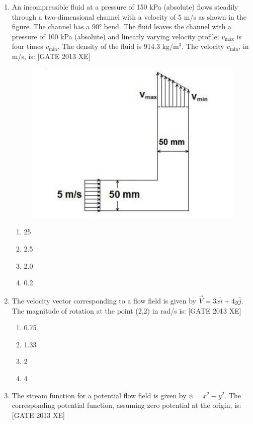 \documentclass[journal,12pt,onecolumn]{IEEEtran}
\theoremstyle{remark}
\begin{document}
\begin{enumerate}
\item An incompressible fluid at a pressure of 150 kPa (absolute) flows steadily through a two-dimensional channel with a velocity of 5 m/s as shown in the figure. The channel has a 90° bend. The fluid leaves the channel with a pressure of 100 kPa (absolute) and linearly varying velocity profile; $v_{\max}$ is four times $v_{\min}$. The density of the fluid is 914.3 kg/m$^3$. The velocity $v_{\min}$, in m/s, is: \hfill[GATE 2013 XE]

\begin{figure}[H]
    \centering
    \includegraphics[width=0.5\columnwidth]{figs/fig4.png}
    \caption{}
    \label{fig:fig4}
\end{figure}
\begin{multicols}{4}
\begin{enumerate}
\item 25
\item 2.5
\item 2.0
\item 0.2
\end{enumerate}
\end{multicols}

\item The velocity vector corresponding to a flow field is given by $\vec{V} = 3x \hat{i} + 4 y \hat{j}$. The magnitude of rotation at the point (2,2) in rad/s is: \hfill[GATE 2013 XE]

\begin{multicols}{4}
\begin{enumerate}
\item 0.75
\item 1.33
\item 2
\item 4
\end{enumerate}
\end{multicols}

\item The stream function for a potential flow field is given by $\psi = x^2 - y^2$. The corresponding potential function, assuming zero potential at the origin, is: \hfill[GATE 2013 XE]


\end{enumerate}
\end{document}
